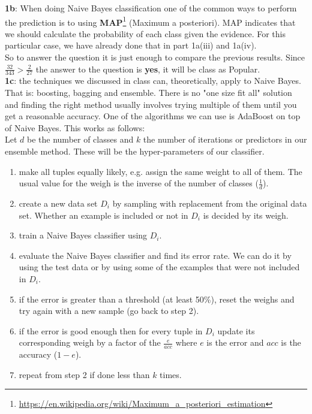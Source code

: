 \documentclass[11pt]{article}
\begin{document}
\textbf{1b}: When doing Naive Bayes classification one of the common ways to perform the prediction is to using \textbf{MAP}\footnote{\url{https://en.wikipedia.org/wiki/Maximum_a_posteriori_estimation}} (Maximum a posteriori). MAP indicates that we should calculate the probability of each class given the evidence. For this particular case, we have already done that in part 1a(iii) and 1a(iv). \\

So to answer the question it is just enough to compare the previous results. Since $\frac{32}{343} > \frac{2}{27}$ the answer to the question is \textbf{yes}, it will be class as Popular.\\

\textbf{1c}: the techniques we discussed in class can, theoretically, apply to Naive Bayes. That is: boosting, bagging and ensemble. There is no "one size fit all" solution and finding the right method usually involves trying multiple of them until you get a reasonable accuracy. One of the algorithms we can use is AdaBoost on top of Naive Bayes. This works as follows: \\

Let $d$ be the number of classes and $k$ the number of iterations or predictors in our ensemble method. These will be the hyper-parameters of our classifier.
\begin{enumerate}
\item make all tuples equally likely, e.g. assign the same weight to all of them. The usual value for the weigh is the inverse of the number of classes ($\frac{1}{d}$).
\item create a new data set $D_i$ by sampling with replacement from the original data set. Whether an example is included or not in $D_i$ is decided by its weigh. 
\item train a Naive Bayes classifier using $D_i$.
\item evaluate the Naive Bayes classifier and find its error rate. We can do it by using the test data or by using some of the examples that were not included in $D_i$. 
\item if the error is greater than a threshold (at least 50\%), reset the weighs and try again with a new sample (go back to step 2).
\item if the error is good enough then for every tuple in $D_i$ update its corresponding weigh by a factor of the $\frac{e}{acc}$ where $e$ is the error and $acc$ is the accuracy ($1 - e$).
\item repeat from step 2 if done less than $k$ times.
\end{enumerate}
\end{document}
